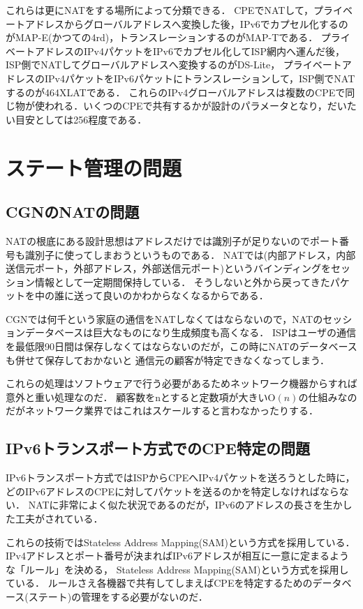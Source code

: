 これらは更にNATをする場所によって分類できる．
CPEでNATして，プライベートアドレスからグローバルアドレスへ変換した後，IPv6でカプセル化するのがMAP-E(かつての4rd)，トランスレーションするのがMAP-Tである．
プライベートアドレスのIPv4パケットをIPv6でカプセル化してISP網内へ運んだ後，ISP側でNATしてグローバルアドレスへ変換するのがDS-Lite，
プライベートアドレスのIPv4パケットをIPv6パケットにトランスレーションして，ISP側でNATするのが464XLATである．
これらのIPv4グローバルアドレスは複数のCPEで同じ物が使われる．いくつのCPEで共有するかが設計のパラメータとなり，だいたい目安としては256程度である．

\section{ステート管理の問題}

\subsection{CGNのNATの問題}

NATの根底にある設計思想はアドレスだけでは識別子が足りないのでポート番号も識別子に使ってしまおうというものである．
NATでは(内部アドレス，内部送信元ポート，外部アドレス，外部送信元ポート)というバインディングをセッション情報として一定期間保持している．
そうしないと外から戻ってきたパケットを中の誰に送って良いのかわからなくなるからである．

CGNでは何千という家庭の通信をNATしなくてはならないので，NATのセッションデータベースは巨大なものになり生成頻度も高くなる．
ISPはユーザの通信を最低限90日間は保存しなくてはならないのだが，この時にNATのデータベースも併せて保存しておかないと
通信元の顧客が特定できなくなってしまう．

これらの処理はソフトウェアで行う必要があるためネットワーク機器からすれば意外と重い処理なのだ．
顧客数をnとすると定数項が大きい$\mathrm{O}(n)$の仕組みなのだがネットワーク業界ではこれはスケールすると言わなかったりする．

\subsection{IPv6トランスポート方式でのCPE特定の問題}

IPv6トランスポート方式ではISPからCPEへIPv4パケットを送ろうとした時に，
どのIPv6アドレスのCPEに対してパケットを送るのかを特定しなければならない．
NATに非常によく似た状況であるのだが，IPv6のアドレスの長さを生かした工夫がされている．

これらの技術ではStateless Address Mapping(SAM)という方式を採用している．
IPv4アドレスとポート番号が決まればIPv6アドレスが相互に一意に定まるような「ルール」を決める，
Stateless Address Mapping(SAM)という方式を採用している．
ルールさえ各機器で共有してしまえばCPEを特定するためのデータベース(ステート)の管理をする必要がないのだ．


